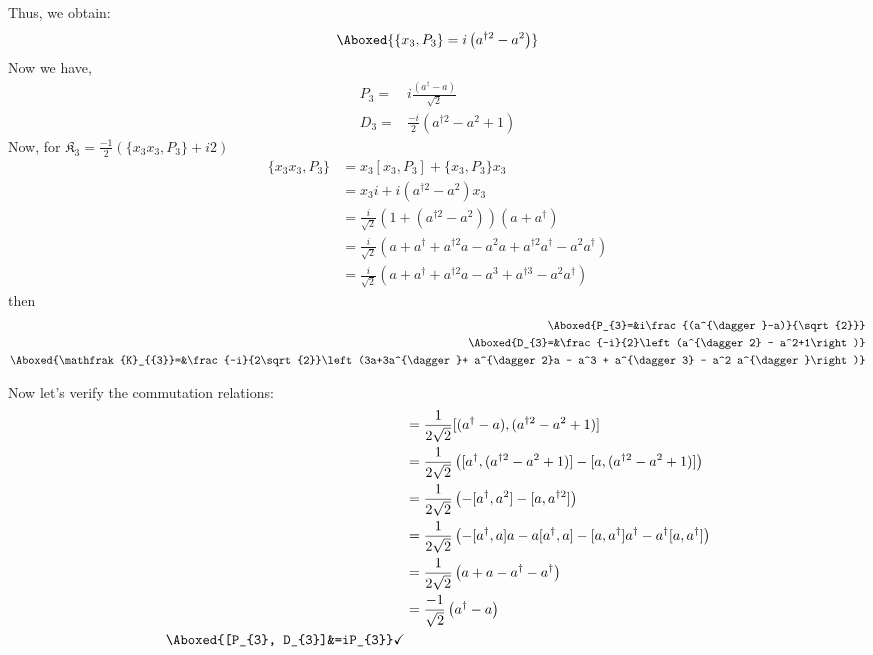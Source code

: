 \documentclass[]{article}
\numberwithin{equation}{section}
\begin{document}
{{Thus, we obtain:
\begin{align}
    \Aboxed{\{x_{3},P_{3}\} = i \left(a^{\dagger 2} - a^2\right)}
\end{align}
Now we have,
\begin{align}
    P_{3}=&i\frac{(a^{\dagger}-a)}{\sqrt{2}}\\
    D_{3}=&\frac{-i}{2}\left(a^{\dagger 2} - a^2+1\right)
\end{align}
Now, for $\mathfrak{K}_{{3}}=\frac{-1}{2}\left(\{x_{3}x_{3},P_{3}\}+i2\right)$
\begin{align}
\{x_{3}x_{3},P_{3}\}&=x_{3}\left[x_{3},P_{3}\right]+\{x_{3},P_{3}\}x_{3}\\
&=x_{3}i+ i \left(a^{\dagger 2} - a^2\right)x_{3}\\
&=\frac{i}{\sqrt{2}}\left(1+  \left(a^{\dagger 2} - a^2\right)\right)\left(a+a^{\dagger}\right)\\
&=\frac{i}{\sqrt{2}}\left(a+a^{\dagger}+  a^{\dagger 2}a - a^2a +  a^{\dagger 2} a^{\dagger} - a^2 a^{\dagger}\right)\\
&=\frac{i}{\sqrt{2}}\left(a+a^{\dagger}+  a^{\dagger 2}a - a^3 +  a^{\dagger 3} - a^2 a^{\dagger}\right)
\end{align}
then
\begin{align}
    \Aboxed{P_{3}=&i\frac{(a^{\dagger}-a)}{\sqrt{2}}}\\
    \Aboxed{D_{3}=&\frac{-i}{2}\left(a^{\dagger 2} - a^2+1\right)}\\
    \Aboxed{\mathfrak{K}_{{3}}=&\frac{-i}{2\sqrt{2}}\left(3a+3a^{\dagger}+  a^{\dagger 2}a - a^3 +  a^{\dagger 3} - a^2 a^{\dagger}\right)}
\end{align}

Now let's verify the commutation relations:
\begin{align}
    [P_{3}, D_{3}]&=\frac{1}{2\sqrt{2}}[(a^{\dagger}-a), (a^{\dagger 2} - a^2+1)]\\
    &=\frac{1}{2\sqrt{2}}\left([a^{\dagger}, (a^{\dagger 2} - a^2+1)]-[a, (a^{\dagger 2} - a^2+1)]\right)\\
    &=\frac{1}{2\sqrt{2}}\left(-[a^{\dagger}, a^2]-[a, a^{\dagger 2} ]\right)\\
    &=\frac{1}{2\sqrt{2}}\left(-[a^{\dagger}, a]a-a[a^{\dagger}, a]-[a, a^{\dagger } ]a^{\dagger }-a^{\dagger }[a, a^{\dagger } ]\right)\\
    &=\frac{1}{2\sqrt{2}}\left(a+a-a^{\dagger }-a^{\dagger } \right)\\
    &=\frac{-1}{\sqrt{2}}\left(a^{\dagger } - a\right)\\
    \Aboxed{[P_{3}, D_{3}]&=iP_{3}}\checkmark
\end{align}

}}
\end{document}
